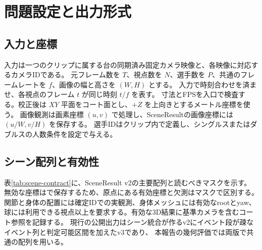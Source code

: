\section{問題設定と出力形式}
\label{sec:problem-and-output}

\subsection{入力と座標}

入力は一つのクリップに属する台の同期済み固定カメラ映像と、各映像に対応するカメラIDである。
元フレーム数を $T$、視点数を $N$、選手数を $P$、共通のフレームレートを $f$、画像の幅と高さを $(W,H)$ とする。
入力で時刻合わせを済ませ、各視点のフレーム $t$ が同じ時刻 $t/f$ を表す。
寸法とFPSを入口で検査する。校正後は $XY$ 平面をコート面とし、$+Z$ を上向きとするメートル座標を使う。
画像観測は画素座標 $(u,v)$ で処理し、SceneResultの画像座標には $(u/W,v/H)$ を保存する。
選手IDはクリップ内で定義し、シングルスまたはダブルスの人数条件を設定で与える。

\subsection{シーン配列と有効性}

表\ref{tab:scene-contract}に、SceneResult v2の主要配列と読むべきマスクを示す。
無効な座標はで保存するため、原点にある有効座標と欠測はマスクで区別する。
関節と身体の配置には確定IDでの実観測、身体メッシュには有効なrootとyaw、
球には利用できる視点以上を要求する。有効な3D結果に基準カメラを含むコート参照を記録する。
現行の公開出力はシーン統合が作るv2にイベント段が疎なイベント列と判定可能区間を加えたv3であり、
本報告の幾何評価では両版で共通の配列を用いる。


